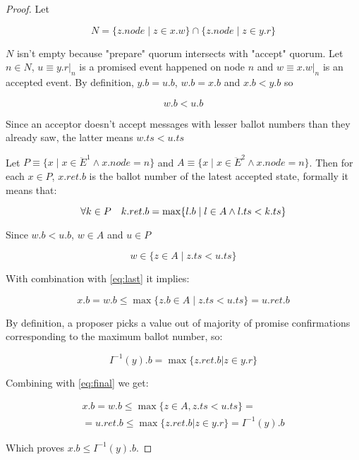 \documentclass[a4paper,USenglish]{lipics-v2018}
\theoremstyle{definition}
\begin{document}
\begin{proof}
    Let
    
    $$N = \{z.node \;|\; z \in x.w\} \cap \{z.node \;|\; z \in y.r\}$$
  
    $N$ isn't empty because "prepare" quorum intersects with "accept" quorum. Let $n \in N$, $u \equiv y.r |_n$ is a promised event happened on node $n$ and $w \equiv x.w |_n$ is an accepted event. By definition, $y.b = u.b$, $w.b = x.b$ and $x.b < y.b$ so
  
    \begin{equation}
        w.b < u.b
    \end{equation}

    Since an acceptor doesn’t accept messages with lesser ballot numbers than they already saw, the latter means $w.ts < u.ts$
  
    Let $P \equiv \{ x \;|\; x \in \ddot{E}^1 \land x.node = n\}$ and $A \equiv \{ x \;|\; x \in \ddot{E}^2 \land x.node = n \}$. Then for each $x \in P$, $x.ret.b$ is the ballot number of the latest accepted state, formally it means that:
  
    \begin{equation} \label{eq:last}
        \forall k \in P \quad k.ret.b = \max \{ l.b \;|\;l \in A \land l.ts < k.ts \} \\
    \end{equation}
  
    Since $w.b < u.b$, $w \in A$ and $u \in P$
  
    \begin{equation}
        w \in \{ z \in A \;|\; z.ts < u.ts \}
    \end{equation}
  
    With combination with \ref{eq:last} it implies:
  
    \begin{equation} \label{eq:final}
        x.b = w.b \leq \max \{ z.b \in A \;|\; z.ts < u.ts \} = u.ret.b
    \end{equation}
  
    By definition, a proposer picks a value out of majority of promise confirmations corresponding to the maximum ballot number, so:
  
    \begin{equation}
        I^{-1}(y).b = \max \{ z.ret.b | z \in y.r \}
    \end{equation}
  
    Combining with \ref{eq:final} we get:
  
    \begin{multline}
        x.b = w.b \leq \max \{ z \in A, z.ts < u.ts \} = \\
        = u.ret.b \leq \max \{ z.ret.b | z \in y.r \} = I^{-1}(y).b
    \end{multline}
  
    Which proves $x.b \leq I^{-1}(y).b$.
  
\end{proof}
\end{document}
